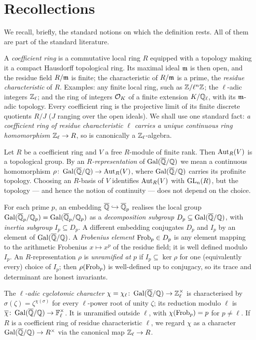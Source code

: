 \documentclass[11pt]{article}
\begin{document}
\section{Recollections}

We recall, briefly, the standard notions on which the definition rests. All of
them are part of the standard literature.

A \emph{coefficient ring} is a commutative local ring $R$ equipped with a
topology making it a compact Hausdorff topological ring. Its maximal ideal
$\mathfrak{m}$ is then open, and the residue field $R/\mathfrak{m}$ is finite; the characteristic
of $R/\mathfrak{m}$ is a prime, the \emph{residue characteristic} of $R$. Examples: any
finite local ring, such as $\mathbb{Z}/\ell^n\mathbb{Z}$; the $\ell$-adic integers $\mathbb{Z}_\ell$; and
the ring of integers $\mathcal{O}_K$ of a finite extension $K/\mathbb{Q}_\ell$, with its
$\mathfrak{m}$-adic topology. Every coefficient ring is the projective limit of its
finite discrete quotients $R/J$ ($J$ ranging over the open ideals). We shall
use one standard fact: \emph{a coefficient ring of residue characteristic
$\ell$ carries a unique continuous ring homomorphism $\mathbb{Z}_\ell\to R$}, so is
canonically a $\mathbb{Z}_\ell$-algebra.

Let $R$ be a coefficient ring and $V$ a free $R$-module of finite rank. Then
$\operatorname{Aut}_R(V)$ is a topological group. By an \emph{$R$-representation} of $\operatorname{Gal}(\overline{\mathbb{Q}}/\mathbb{Q})$ we
mean a continuous homomorphism $\rho\colon\operatorname{Gal}(\overline{\mathbb{Q}}/\mathbb{Q})\to\operatorname{Aut}_R(V)$, where $\operatorname{Gal}(\overline{\mathbb{Q}}/\mathbb{Q})$ carries
its profinite topology. Choosing an $R$-basis of $V$ identifies $\operatorname{Aut}_R(V)$
with $\operatorname{GL}_n(R)$, but the topology --- and hence the notion of continuity ---
does not depend on the choice.

For each prime $p$, an embedding $\overline{\mathbb{Q}}\hookrightarrow\overline{\mathbb{Q}}_p$ realises the local
group $\operatorname{Gal}(\overline{\mathbb{Q}}_p/\mathbb{Q}_p)=\operatorname{Gal}(\overline{\mathbb{Q}}_p/\mathbb{Q}_p)$ as a \emph{decomposition subgroup} $D_p\subseteq
\operatorname{Gal}(\overline{\mathbb{Q}}/\mathbb{Q})$, with \emph{inertia subgroup} $I_p\subseteq D_p$. A different embedding
conjugates $D_p$ and $I_p$ by an element of $\operatorname{Gal}(\overline{\mathbb{Q}}/\mathbb{Q})$. A \emph{Frobenius element}
$\operatorname{Frob}_p\in D_p$ is any element mapping to the arithmetic Frobenius
$x\mapsto x^p$ of the residue field; it is well defined modulo $I_p$. An
$R$-representation $\rho$ is \emph{unramified at $p$} if $I_p\subseteq\ker\rho$
for one (equivalently every) choice of $I_p$; then $\rho(\operatorname{Frob}_p)$ is
well-defined up to conjugacy, so its trace and determinant are honest
invariants.

The \emph{$\ell$-adic cyclotomic character}
$\chi=\chi_\ell\colon\operatorname{Gal}(\overline{\mathbb{Q}}/\mathbb{Q})\to\mathbb{Z}_\ell^\times$ is characterised by
$\sigma(\zeta)=\zeta^{\chi(\sigma)}$ for every $\ell$-power root of unity
$\zeta$; its reduction modulo $\ell$ is $\overline{\chi}\colon\operatorname{Gal}(\overline{\mathbb{Q}}/\mathbb{Q})\to\mathbb{F}_\ell^\times$. It is
unramified outside $\ell$, with $\chi(\operatorname{Frob}_p)=p$ for $p\neq\ell$. If $R$ is a
coefficient ring of residue characteristic $\ell$, we regard $\chi$ as a
character $\operatorname{Gal}(\overline{\mathbb{Q}}/\mathbb{Q})\to R^\times$ via the canonical map $\mathbb{Z}_\ell\to R$.
\end{document}

